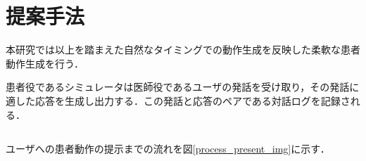 \chapter{提案手法} \label{concept}
本研究では以上を踏まえた自然なタイミングでの動作生成を反映した柔軟な患者動作生成を行う．
\par
患者役であるシミュレータは医師役であるユーザの発話を受け取り，その発話に適した応答を生成し出力する．この発話と応答のペアである対話ログを記録される．

\section{}
\begin{figure}[p]
\end{figure}

\par 
ユーザへの患者動作の提示までの流れを図\ref{process_present_img}に示す．
